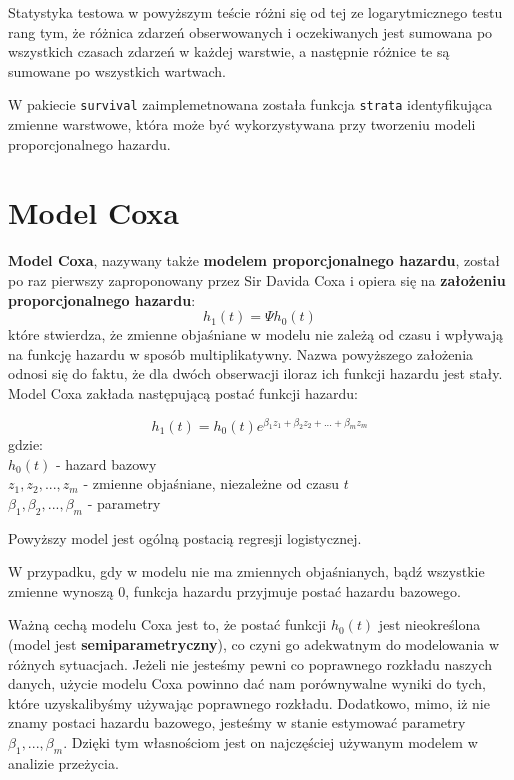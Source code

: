 \documentclass[]{pracamgr}
\begin{document}
Statystyka testowa w powyższym teście różni się od tej ze logarytmicznego testu rang tym, że różnica zdarzeń obserwowanych i oczekiwanych jest sumowana po wszystkich czasach zdarzeń w każdej warstwie, a następnie różnice te są sumowane po wszystkich wartwach. 

W pakiecie \texttt{survival} zaimplemetnowana została funkcja \texttt{strata} identyfikująca zmienne warstwowe, która może być wykorzystywana przy tworzeniu modeli proporcjonalnego hazardu.

\section{Model Coxa}

\textbf{Model Coxa}, nazywany także \textbf{modelem proporcjonalnego hazardu}, został po raz pierwszy zaproponowany przez Sir Davida Coxa i opiera się na \textbf{założeniu proporcjonalnego hazardu}:
\begin{equation}\label{ph assum}
h_1(t)  = \Psi h_0(t)
\end{equation}
które stwierdza, że zmienne objaśniane w modelu nie zależą od czasu i wpływają na funkcję hazardu w sposób multiplikatywny. Nazwa powyższego założenia odnosi się do faktu, że dla dwóch obserwacji iloraz ich funkcji hazardu jest stały. Model Coxa zakłada następującą postać funkcji hazardu:

\begin{equation}
h_1(t) = h_0(t) e^{\beta_1z_1 + \beta_2z_2 +...+ \beta_mz_m}
\end{equation}
gdzie: \\
$h_0(t)$ - hazard bazowy \\
$z_1, z_2,..., z_m$ - zmienne objaśniane, niezależne od czasu $t$ \\
$\beta_1, \beta_2,...,\beta_m$ - parametry

Powyższy model jest ogólną postacią regresji logistycznej. 

W przypadku, gdy w modelu nie ma zmiennych objaśnianych, bądź wszystkie zmienne wynoszą $0$, funkcja hazardu przyjmuje postać hazardu bazowego.

Ważną cechą modelu Coxa jest to, że postać funkcji $h_0(t)$ jest nieokreślona (model jest \textbf{semiparametryczny}), co czyni go adekwatnym do modelowania w różnych sytuacjach. Jeżeli nie jesteśmy pewni co poprawnego rozkładu naszych danych, użycie modelu Coxa powinno dać nam porównywalne wyniki do tych, które uzyskalibyśmy używając poprawnego rozkładu. Dodatkowo, mimo, iż nie znamy postaci hazardu bazowego, jesteśmy w stanie estymować parametry $\beta_1,...,\beta_m$. Dzięki tym własnościom jest on najczęściej używanym modelem w analizie przeżycia. 
\end{document}
